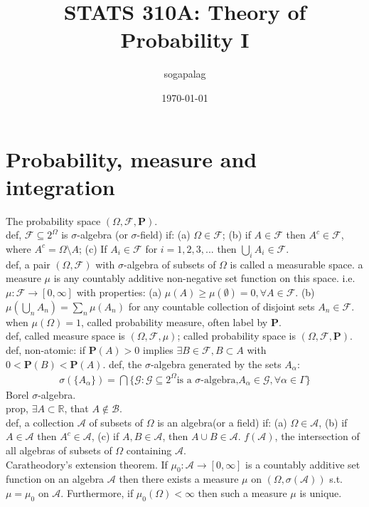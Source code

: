 \documentclass[paper=a4, fontsize=11pt]{scrartcl} %
\title{STATS 310A: Theory of Probability I}
\author{sogapalag}
\date{\normalsize\today}
\numberwithin{equation}{section} %
\numberwithin{figure}{section} %
\numberwithin{table}{section} %
\begin{document}
\maketitle

\section{Probability, measure and integration}
The probability space $(\Omega,\mathcal{F},\mathbf{P})$.\\
def, $\mathcal{F}\subseteq 2^\Omega$ is $\sigma$-algebra (or $\sigma$-field) if: (a) $\Omega\in \mathcal{F}$; (b) if $A\in \mathcal{F}$ then $A^c\in \mathcal{F}$, where $A^c=\Omega\setminus A$; (c) If $A_i\in \mathcal{F}$ for $i=1,2,3,...$ then $\bigcup_i A_i\in \mathcal{F}$.\\
def, a pair $(\Omega, \mathcal{F})$ with $\sigma$-algebra of subsets of $\Omega$ is called a measurable space. a measure $\mu$ is any countably additive non-negative set function on this space. i.e. $\mu: \mathcal{F}\rightarrow [0,\infty]$ with properties: (a) $\mu(A)\geq \mu(\emptyset)=0, \forall A\in \mathcal{F}$. (b) $\mu(\bigcup_n A_n) = \sum_n \mu(A_n) $ for any countable collection of disjoint sets $A_n\in \mathcal{F}$.\\
when $\mu(\Omega)=1$, called probability measure, often label by $\mathbf{P}$.\\
def, called measure space is $(\Omega,\mathcal{F},\mu)$; called probability space is $(\Omega, \mathcal{F}, \mathbf{P})$.\\
def, non-atomic: if $\mathbf{P}(A)>0$ implies $\exists B\in \mathcal{F}, B\subset A$ with $0<\mathbf{P}(B)<\mathbf{P}(A)$.
def, the $\sigma$-algebra generated by the sets $A_\alpha$:
\begin{align}
	\sigma(\{A_\alpha\}) = \bigcap \{\mathcal{G}: \mathcal{G}\subseteq 2^\Omega \text{is a $\sigma$-algebra,} A_\alpha\in \mathcal{G},\forall\alpha\in \Gamma\}
\end{align}
Borel $\sigma$-algebra.\\
prop, $\exists A\subset \mathbb{R}$, that $A\notin \mathcal{B}$.\\
def, a collection $\mathcal{A}$ of subsets of $\Omega$ is an algebra(or a field) if: (a) $\Omega\in\mathcal{A}$, (b) if $A\in\mathcal{A}$ then $A^c\in\mathcal{A}$, (c) if $A,B\in\mathcal{A}$, then $A\cup B\in \mathcal{A}$.
$f(\mathcal{A})$, the intersection of all algebras of subsets of $\Omega$ containing $\mathcal{A}$.\\
Caratheodory's extension theorem. If $\mu_0: \mathcal{A}\rightarrow [0,\infty]$ is a countably additive set function on an algebra $\mathcal{A}$ then there exists a measure $\mu$ on $(\Omega, \sigma(\mathcal{A}))$ s.t. $\mu=\mu_0$ on $\mathcal{A}$. Furthermore, if $\mu_0(\Omega)<\infty$ then such a measure $\mu$ is unique.
\end{document}
